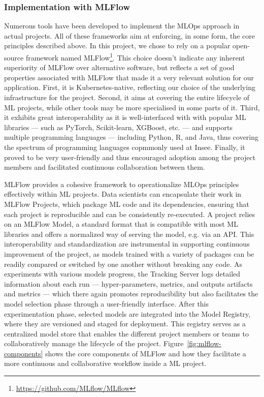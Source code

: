 \subsubsection{Implementation with MLFlow}

Numerous tools have been developed to implement the MLOps approach in actual projects. All of these frameworks aim at enforcing, in some form, the core principles described above. In this project, we chose to rely on a popular open-source framework named MLFlow\footnote{\url{https://github.com/MLflow/MLflow}}. This choice doesn't indicate any inherent superiority of MLFlow over alternative software, but reflects a set of good properties associated with MLFlow that made it a very relevant solution for our application. First, it is Kubernetes-native, reflecting our choice of the underlying infrastructure for the project. Second, it aims at covering the entire lifecycle of ML projects, while other tools may be more specialised in some parts of it. Third, it exhibits great interoperability as it is well-interfaced with with popular ML libraries — such as PyTorch, Scikit-learn, XGBoost, etc. — and supports multiple programming languages — including Python, R, and Java, thus covering the spectrum of programming languages copmmonly used at Insee. Finally, it proved to be very user-friendly and thus encouraged adoption among the project members and facilitated continuous collaboration between them.

MLFlow provides a cohesive framework to operationalize MLOps principles effectively within ML projects. Data scientists can encapsulate their work in MLFlow Projects, which package ML code and its dependencies, ensuring that each project is reproducible and can be consistently re-executed. A project relies on an MLFlow Model, a standard format that is compatible with most ML libraries and offers a normalized way of serving the model, e.g. via an API. This interoperability and standardization are instrumental in supporting continuous improvement of the project, as models trained with a variety of packages can be readily compared or switched by one another without breaking any code. As experiments with various models progress, the Tracking Server logs detailed information about each run — hyper-parameters, metrics, and outputs artifacts and metrics — which there again promotes reproducibility but also facilitates the model selection phase through a user-friendly interface. After this experimentation phase, selected models are integrated into the Model Registry, where they are versioned and staged for deployment. This registry serves as a centralized model store that enables the different project members or teams to collaboratively manage the lifecycle of the project. Figure~\ref{fig:mlflow-components} shows the core components of MLFlow and how they facilitate a more continuous and collaborative workflow inside a ML project.

